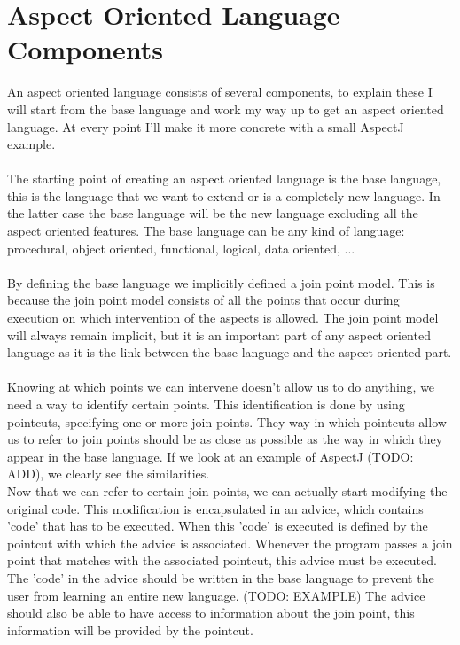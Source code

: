 \documentclass[a4paper]{report}
\begin{document}
\chapter{Aspect Oriented Language Components}
An aspect oriented language consists of several components, to explain these I will start from the base language and work my way up to get an aspect oriented language. At every point I'll make it more concrete with a small AspectJ example.\\
\\
The starting point of creating an aspect oriented language is the base language, this is the language that we want to extend or is a completely new language. In the latter case the base language will be the new language excluding all the aspect oriented features. The base language can be any kind of language: procedural, object oriented, functional, logical, data oriented, ...\\
\\
By defining the base language we implicitly defined a join point model. This is because the join point model consists of all the points that occur during execution on which intervention of the aspects is allowed. The join point model will always remain implicit, but it is an important part of any aspect oriented language as it is the link between the base language and the aspect oriented part.\\
\\
Knowing at which points we can intervene doesn't allow us to do anything, we need a way to identify certain points. This identification is done by using pointcuts, specifying one or more join points. They way in which pointcuts allow us to refer to join points should be as close as possible as the way in which they appear in the base language. If we look at an example of AspectJ (TODO: ADD), we clearly see the similarities.
\\
Now that we can refer to certain join points, we can actually start modifying the original code. This modification is encapsulated in an advice, which contains 'code' that has to be executed. When this 'code' is executed is defined by the pointcut with which the advice is associated. Whenever the program passes a join point that matches with the associated pointcut, this advice must be executed. The 'code' in the advice should be written in the base language to prevent the user from learning an entire new language. (TODO: EXAMPLE) The advice should also be able to have access to information about the join point, this information will be provided by the pointcut.\\
\end{document}
